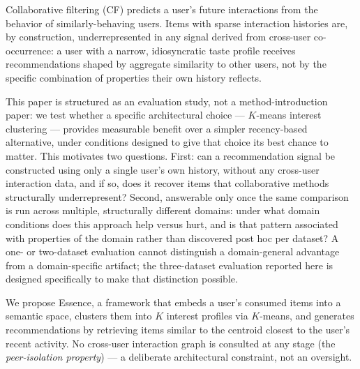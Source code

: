 \documentclass{article}
\begin{document}
Collaborative filtering (CF) predicts a user's future interactions from the behavior of similarly-behaving users. Items with sparse interaction histories are, by construction, underrepresented in any signal derived from cross-user co-occurrence: a user with a narrow, idiosyncratic taste profile receives recommendations shaped by aggregate similarity to other users, not by the specific combination of properties their own history reflects.

This paper is structured as an evaluation study, not a method-introduction paper: we test whether a specific architectural choice --- $K$-means interest clustering --- provides measurable benefit over a simpler recency-based alternative, under conditions designed to give that choice its best chance to matter. This motivates two questions. First: can a recommendation signal be constructed using only a single user's own history, without any cross-user interaction data, and if so, does it recover items that collaborative methods structurally underrepresent? Second, answerable only once the same comparison is run across multiple, structurally different domains: under what domain conditions does this approach help versus hurt, and is that pattern associated with properties of the domain rather than discovered post hoc per dataset? A one- or two-dataset evaluation cannot distinguish a domain-general advantage from a domain-specific artifact; the three-dataset evaluation reported here is designed specifically to make that distinction possible.

We propose Essence, a framework that embeds a user's consumed items into a semantic space, clusters them into $K$ interest profiles via $K$-means, and generates recommendations by retrieving items similar to the centroid closest to the user's recent activity. No cross-user interaction graph is consulted at any stage (the \emph{peer-isolation property}) --- a deliberate architectural constraint, not an oversight.
\end{document}
